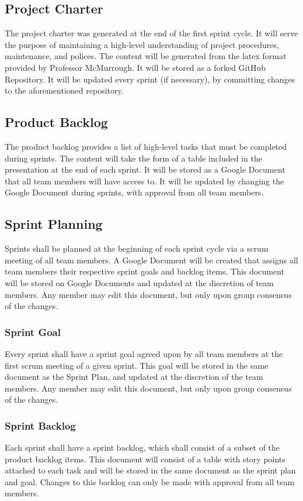 \subsection{Project Charter}
The project charter was generated at the end of the first sprint cycle. It will serve the purpose of maintaining a high-level understanding of project procedures, maintenance, and polices. The content will be generated from the latex format provided by Professor McMurrough. It will be stored as a forked GitHub Repository. It will be updated every sprint (if necessary), by committing changes to the aforementioned repository.

\subsection{Product Backlog}
The product backlog provides a list of high-level tasks that must be completed during sprints. The content will take the form of a table included in the presentation at the end of each sprint. It will be stored as a Google Document that all team members will have access to. It will be updated by changing the Google Document during sprints, with approval from all team members. 

\subsection{Sprint Planning}
Sprints shall be planned at the beginning of each sprint cycle via a scrum meeting of all team members. A Google Document will be created that assigns all team members their respective sprint goals and backlog items. This document will be stored on Google Documents and updated at the discretion of team members. Any member may edit this document, but only upon group consensus of the changes.

\subsubsection{Sprint Goal}
Every sprint shall have a sprint goal agreed upon by all team members at the first scrum meeting of a given sprint. This goal will be stored in the same document as the Sprint Plan, and updated at the discretion of the team members. Any member may edit this document, but only upon group consensus of the changes.

\subsubsection{Sprint Backlog}
Each sprint shall have a sprint backlog, which shall consist of a subset of the product backlog items. This document will consist of a table with story points attached to each task and will be stored in the same document as the sprint plan and goal. Changes to this backlog can only be made with approval from all team members.

